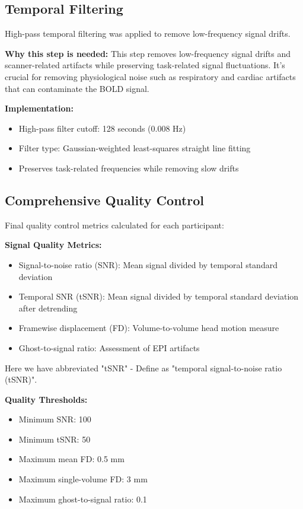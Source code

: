 \subsection{Temporal Filtering}
High-pass temporal filtering was applied to remove low-frequency signal drifts.

\vspace{0.5\baselineskip}
\noindent
\textbf{Why this step is needed:} This step removes low-frequency signal drifts and scanner-related artifacts while preserving task-related signal fluctuations. It's crucial for removing physiological noise such as respiratory and cardiac artifacts that can contaminate the BOLD signal.

\noindent
\textbf{Implementation:}
\begin{itemize}
\item High-pass filter cutoff: 128 seconds (0.008 Hz)
\item Filter type: Gaussian-weighted least-squares straight line fitting
\item Preserves task-related frequencies while removing slow drifts
\end{itemize}


\subsection{Comprehensive Quality Control}
Final quality control metrics calculated for each participant:

\vspace{0.5\baselineskip}
\noindent
\textbf{Signal Quality Metrics:} 
\begin{itemize}
\item Signal-to-noise ratio (SNR): Mean signal divided by temporal standard deviation
\item Temporal SNR (tSNR): Mean signal divided by temporal standard deviation after detrending
\item Framewise displacement (FD): Volume-to-volume head motion measure
\item Ghost-to-signal ratio: Assessment of EPI artifacts
\end{itemize}
Here we have abbreviated "tSNR" - Define as "temporal signal-to-noise ratio (tSNR)".

\noindent
\textbf{Quality Thresholds:}
\begin{itemize}
\item Minimum SNR: 100
\item Minimum tSNR: 50
\item Maximum mean FD: 0.5 mm
\item Maximum single-volume FD: 3 mm
\item Maximum ghost-to-signal ratio: 0.1
\end{itemize}

